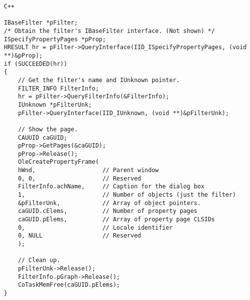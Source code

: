 \begin{verbatim}
C++

IBaseFilter *pFilter;
/* Obtain the filter's IBaseFilter interface. (Not shown) */
ISpecifyPropertyPages *pProp;
HRESULT hr = pFilter->QueryInterface(IID_ISpecifyPropertyPages, (void **)&pProp);
if (SUCCEEDED(hr)) 
{
	// Get the filter's name and IUnknown pointer.
	FILTER_INFO FilterInfo;
	hr = pFilter->QueryFilterInfo(&FilterInfo); 
	IUnknown *pFilterUnk;
	pFilter->QueryInterface(IID_IUnknown, (void **)&pFilterUnk);
	
	// Show the page. 
	CAUUID caGUID;
	pProp->GetPages(&caGUID);
	pProp->Release();
	OleCreatePropertyFrame(
	hWnd,                   // Parent window
	0, 0,                   // Reserved
	FilterInfo.achName,     // Caption for the dialog box
	1,                      // Number of objects (just the filter)
	&pFilterUnk,            // Array of object pointers. 
	caGUID.cElems,          // Number of property pages
	caGUID.pElems,          // Array of property page CLSIDs
	0,                      // Locale identifier
	0, NULL                 // Reserved
	);
	
	// Clean up.
	pFilterUnk->Release();
	FilterInfo.pGraph->Release(); 
	CoTaskMemFree(caGUID.pElems);
}

\end{verbatim}